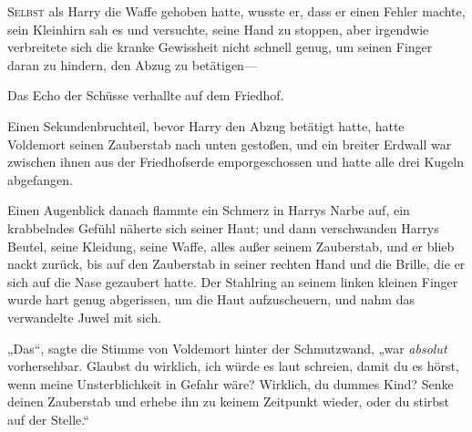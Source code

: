 
\lettrine{S}{elbst} als Harry die Waffe gehoben hatte, wusste er, dass er einen Fehler machte, sein Kleinhirn sah es und versuchte, seine Hand zu stoppen, aber irgendwie verbreitete sich die kranke Gewissheit nicht schnell genug, um seinen Finger daran zu hindern, den Abzug zu betätigen—

Das Echo der Schüsse verhallte auf dem Friedhof.

Einen Sekundenbruchteil, bevor Harry den Abzug betätigt hatte, hatte Voldemort seinen Zauberstab nach unten gestoßen, und ein breiter Erdwall war zwischen ihnen aus der Friedhofserde emporgeschossen und hatte alle drei Kugeln abgefangen.

Einen Augenblick danach flammte ein Schmerz in Harrys Narbe auf, ein krabbelndes Gefühl näherte sich seiner Haut; und dann verschwanden Harrys Beutel, seine Kleidung, seine Waffe, alles außer seinem Zauberstab, und er blieb nackt zurück, bis auf den Zauberstab in seiner rechten Hand und die Brille, die er sich auf die Nase gezaubert hatte. Der Stahlring an seinem linken kleinen Finger wurde hart genug abgerissen, um die Haut aufzuscheuern, und nahm das verwandelte Juwel mit sich.

„Das“, sagte die Stimme von Voldemort hinter der Schmutzwand, „war \emph{absolut} vorhersehbar. Glaubst du wirklich, ich würde es laut schreien, damit du es hörst, wenn meine Unsterblichkeit in Gefahr wäre? Wirklich, du dummes Kind? Senke deinen Zauberstab und erhebe ihn zu keinem Zeitpunkt wieder, oder du stirbst auf der Stelle.“

